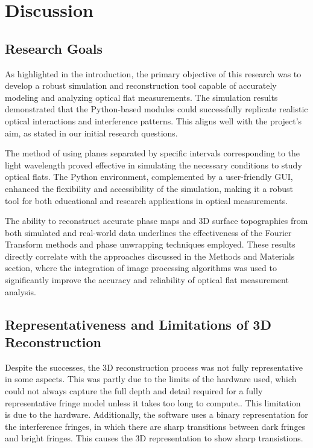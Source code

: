\documentclass[../main.tex]{subfiles}
\begin{document}
{\let\clearpage\relax\chapter{Discussion}}

\section{Research Goals}
As highlighted in the introduction, the primary objective of this research was to develop a robust simulation and reconstruction tool capable of accurately modeling and analyzing optical flat measurements. The simulation results demonstrated that the Python-based modules could successfully replicate realistic optical interactions and interference patterns. This aligns well with the project's aim, as stated in our initial research questions.

The method of using planes separated by specific intervals corresponding to the light wavelength proved effective in simulating the necessary conditions to study optical flats. The Python environment, complemented by a user-friendly GUI, enhanced the flexibility and accessibility of the simulation, making it a robust tool for both educational and research applications in optical measurements.

The ability to reconstruct accurate phase maps and 3D surface topographies from both simulated and real-world data underlines the effectiveness of the Fourier Transform methods and phase unwrapping techniques employed. These results directly correlate with the approaches discussed in the Methods and Materials section, where the integration of image processing algorithms was used to significantly improve the accuracy and reliability of optical flat measurement analysis.

\section{Representativeness and Limitations of 3D Reconstruction}
Despite the successes, the 3D reconstruction process was not fully representative in some aspects. This was partly due to the limits of the hardware used, which could not always capture the full depth and detail required for a fully representative fringe model unless it takes too long to compute.. This limitation is due to the hardware. Additionally, the software uses a binary representation for the interference fringes, in which there are sharp transitions between dark fringes and bright fringes. This causes the 3D representation to show sharp transistions.
\end{document}
